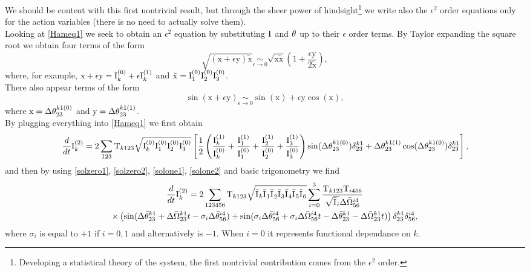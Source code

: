 We should be content with this first nontrivial result, but through the sheer power of hindsight\footnote{Developing a 
statistical theory of the system, the first nontrivial contribution comes from the $\epsilon^2$ order.}
we write also the 
$\epsilon^2$ order equations only for the action variables (there is no need to actually solve them). \\
Looking at \eqref{Hameq1} we seek to obtain an $\epsilon^2$ equation by substituting $\mathrm{I}^{}$ and $\theta^{}$ up to their $\epsilon$ order terms. By Taylor expanding the square root 
we obtain four terms of the form
\begin{equation}
    \sqrt{(\mathrm{x} +\epsilon \mathrm{y})\mathrm{\tilde{x}}} \underset{\epsilon \rightarrow 0}{\sim} 
    \sqrt{\mathrm{x}\mathrm{\tilde{x}}}\left( 1 + \frac{\epsilon \mathrm{y}}{2\mathrm{\tilde{x}}}\right),
\end{equation}
where, for example, $\mathrm{x} + \epsilon \mathrm{y} = \mathrm{I}^{(0)}_k + \epsilon \mathrm{I}^{(1)}_k$ and $\mathrm{\tilde{x}} = \mathrm{I}^{(0)}_1\mathrm{I}^{(0)}_2\mathrm{I}^{(0)}_3$.\\
There also appear terms of the form
\begin{equation}
    \sin(\mathrm{x} + \epsilon \mathrm{y}) \underset{\epsilon \rightarrow 0}{\sim} \sin(\mathrm{x}) + \epsilon \mathrm{y} \cos(\mathrm{x}),
\end{equation} 
where $\mathrm{x} = \Delta\theta^{k1(0)}_{23}$ and $\mathrm{y} = \Delta\theta^{k1(1)}_{23}$.\\
By plugging everything into \eqref{Hameq1} we first obtain
\begin{equation}
    \frac{d}{dt} \mathrm{I}^{(2)}_k = 2 \sum_{123} \mathrm{T}_{k123} \sqrt{\mathrm{I}^{(0)}_k\mathrm{I}^{(0)}_1\mathrm{I}^{(0)}_2\mathrm{I}^{(0)}_3} \left[ \frac{1}{2}\left(\frac{\mathrm{I}^{(1)}_k}{\mathrm{I}^{(0)}_k}+\frac{\mathrm{I}^{(1)}_1}{\mathrm{I}^{(0)}_1}+
    \frac{\mathrm{I}^{(1)}_2}{\mathrm{I}^{(0)}_2}+\frac{\mathrm{I}^{(1)}_3}{\mathrm{I}^{(0)}_3} \right)\sin(\Delta\theta^{k1(0)}_{23})\delta^{k1}_{23} + 
    \Delta\theta^{k1(1)}_{23}\cos(\Delta\theta^{k1(0)}_{23}) \delta^{k1}_{23}\right],
\end{equation}
and then by using \eqref{solzero1}, \eqref{solzero2}, \eqref{solone1}, \eqref{solone2} and basic trigonometry we find
\begin{multline}
    \frac{d}{dt} \mathrm{I}^{(2)}_k = 2 \sum_{123456}\mathrm{T}_{k123} \sqrt{\bar{\mathrm{I}^{}}_k\bar{\mathrm{I}^{}}_1\bar{\mathrm{I}^{}}_2\bar{\mathrm{I}^{}}_3\bar{\mathrm{I}^{}}_4\bar{\mathrm{I}^{}}_5\bar{\mathrm{I}^{}}_6} 
    \sum_{i=0}^{3}\frac{\mathrm{T}_{k123}\mathrm{T}_{i456}}{\sqrt{\bar{\mathrm{I}^{}}_i}\Delta\bar{\Omega}^{i4}_{56}} \\
    \times\left(\sin(\Delta\bar{\theta}^{k1}_{23} + \Delta\bar{\Omega}^{k1}_{23}t - \sigma_i \Delta\bar{\theta}^{i4}_{56}) 
    + \sin(\sigma_i \Delta\bar{\theta}^{i4}_{56} + \sigma_i\Delta\bar{\Omega}^{i4}_{56}t -\Delta\bar{\theta}^{k1}_{23} - \Delta\bar{\Omega}^{k1}_{23}t)  \right)\delta^{k1}_{23}\delta^{i4}_{56}, 
    \label{eqeps2}
\end{multline}
where $\sigma_i$ is equal to $+1$ if $i=0,1$ and alternatively is $-1$. When $i=0$ it represents functional dependance on $k$.\\
